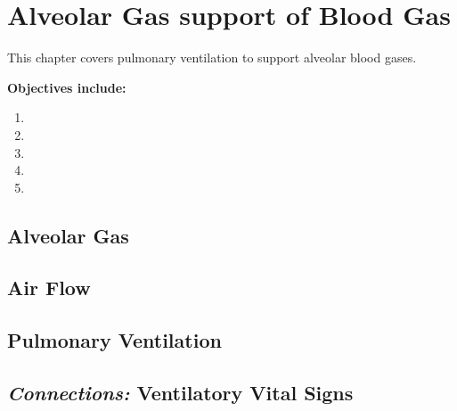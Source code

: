 \chapter{Alveolar Gas support of Blood Gas}\label{chp:alveolar_oxygen}

\minitoc
This chapter covers pulmonary ventilation to support alveolar blood gases.

\vspace{5mm}

\textbf{Objectives include:}
\begin{enumerate}
    \item
    \item
    \item
    \item
    \item
\end{enumerate}

\section{Alveolar Gas}

\section{Air Flow}

\section{Pulmonary Ventilation}

\section{\textit{Connections:} Ventilatory Vital Signs}

\printbibliography[heading=subbibintoc]